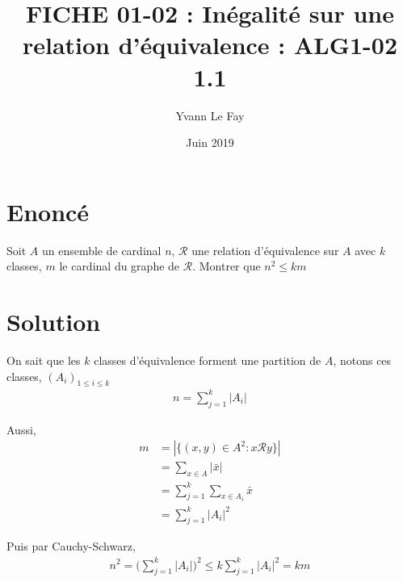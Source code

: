 \documentclass{article}
\begin{document}
\title{FICHE 01-02 : Inégalité sur une relation d'équivalence : ALG1-02 1.1}
\author{Yvann Le Fay}
\date{Juin 2019}
\maketitle

\section*{Enoncé}
Soit $A$ un ensemble de cardinal $n$, $\mathcal{R}$ une relation d'équivalence sur $A$ avec $k$ classes, $m$ le cardinal du graphe de $\mathcal{R}$. Montrer que $n^2\leq km$
\section*{Solution}
On sait que les $k$ classes d'équivalence forment une partition de $A$, notons ces classes, $(A_i)_{1\leq i\leq k}$
\begin{align*}
n = \sum_{j=1}^k |A_i|
\end{align*}

Aussi, 
\begin{align*}
m &= |\{(x,y)\in A^2 : x \mathcal{R} y\}|\\
&=\sum_{x\in A} |\bar{x}|\\
&=\sum_{j=1}^k \sum_{x\in A_i}{\bar{x}}\\
&=\sum_{j=1}^k |A_i|^2 
\end{align*}

Puis par Cauchy-Schwarz, 
\begin{align*}
n^2 =\bigg( \sum_{j=1}^k |A_i|\bigg)^2 \leq k \sum_{j=1}^k |A_i|^2 = km
\end{align*}
\end{document}
